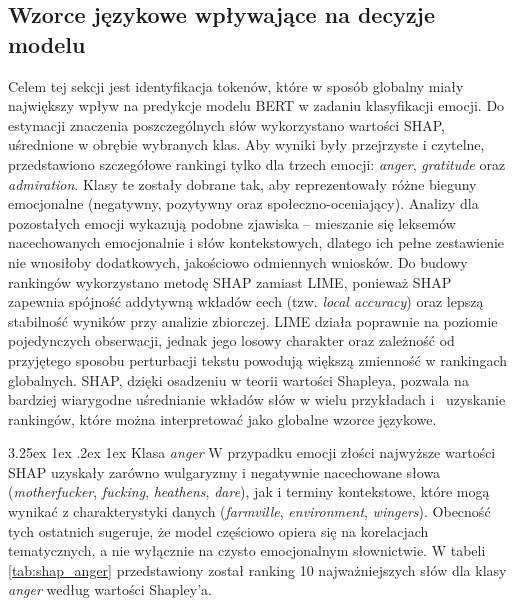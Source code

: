\documentclass[wmii, inf, mgr]{uwmthesis}
\makeatletter
\renewcommand\paragraph{\@startsection{paragraph}{4}{\z@}%
  {3.25ex \@plus1ex \@minus.2ex}%
  {1ex}%
  {\normalfont\normalsize\bfseries}}
\makeatother
\begin{document}
\subsection{Wzorce językowe wpływające na decyzje modelu}
Celem tej sekcji jest identyfikacja tokenów, które w sposób globalny miały największy wpływ na predykcje modelu BERT w zadaniu klasyfikacji emocji. Do estymacji znaczenia poszczególnych słów wykorzystano wartości SHAP, uśrednione w obrębie wybranych klas. Aby wyniki były przejrzyste i czytelne, przedstawiono szczegółowe rankingi tylko dla trzech emocji: \textit{anger}, \textit{gratitude} oraz \textit{admiration}. Klasy te zostały dobrane tak, aby reprezentowały różne bieguny emocjonalne (negatywny, pozytywny oraz społeczno-oceniający). Analizy dla pozostałych emocji wykazują podobne zjawiska -- mieszanie się leksemów nacechowanych emocjonalnie i słów kontekstowych, dlatego ich pełne zestawienie nie wnosiłoby dodatkowych, jakościowo odmiennych wniosków. Do budowy rankingów wykorzystano metodę SHAP zamiast LIME, ponieważ SHAP zapewnia spójność addytywną wkładów cech (tzw. \emph{local accuracy}) oraz lepszą stabilność wyników przy analizie zbiorczej. LIME działa poprawnie na poziomie pojedynczych obserwacji, jednak jego losowy charakter oraz zależność od przyjętego sposobu perturbacji tekstu powodują większą zmienność w rankingach globalnych. SHAP, dzięki osadzeniu w teorii wartości Shapleya, pozwala na bardziej wiarygodne uśrednianie wkładów słów w wielu przykładach i~ uzyskanie rankingów, które można interpretować jako globalne wzorce językowe.


\paragraph{Klasa \textit{anger}}
W przypadku emocji złości najwyższe wartości SHAP uzyskały zarówno wulgaryzmy i negatywnie nacechowane słowa (\textit{motherfucker}, \textit{fucking}, \textit{heathens}, \textit{dare}), jak i terminy kontekstowe, które mogą wynikać z charakterystyki danych (\textit{farmville}, \textit{environment}, \textit{wingers}). Obecność tych ostatnich sugeruje, że model częściowo opiera się na korelacjach tematycznych, a nie wyłącznie na czysto emocjonalnym słownictwie. W tabeli \ref{tab:shap_anger} przedstawiony został ranking 10 najważniejszych słów dla klasy \textit{anger} według wartości Shapley’a.
\end{document}
